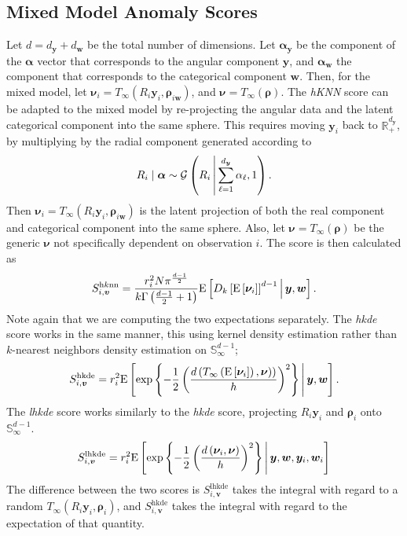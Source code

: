 \subsection{Mixed Model Anomaly Scores\label{sec:mixedscores}}
Let $d = d_{\bm{y}} + d_{\bm{w}}$ be the total number of dimensions.  Let 
    $\bm{\alpha}_{\bm{y}}$ be the component of the $\bm{\alpha}$ vector that 
    corresponds  to the angular component $\bm{y}$, and $\bm{\alpha}_{\bm{w}}$ 
    the component that corresponds to the categorical component $\bm{w}$.
    Then, for the mixed model, let 
    $\bm{\nu}_i = T_{\infty}(R_i\bm{y}_i, \bm{\rho}_{i\bm{w}})$, and 
    $\bm{\nu} = T_{\infty}(\bm{\rho})$.  The \emph{hKNN} score can be adapted 
    to the mixed model by re-projecting the angular data and the latent 
    categorical component into the same sphere. This requires moving $\bm{y}_i$ 
    back to $\mathbb{R}_+^{d_{\bm{y}}}$, by multiplying by the radial component
    generated according to
    \[
        R_i\mid\bm{\alpha} \sim \mathcal{G}
        \left(R_i\,\middle\vert\,\sum_{\ell = 1}^{d_{\bm{y}}}\alpha_{\ell}, 1\right).
    \]
    Then $\bm{\nu}_i = T_{\infty}(R_i\bm{y}_i, \bm{\rho}_{i\bm{w}})$ is the 
    latent projection of both the real component and categorical component into 
    the same sphere.  Also, let $\bm{\nu} = T_{\infty}(\bm{\rho})$ be the 
    generic $\bm{\nu}$ not specifically dependent on observation $i$.  The 
    score is then calculated as
    \[
        S_{i,\bm{v}}^{\text{h$k$nn}} = \frac{r_i^2 N\pi^{\frac{d-1}{2}}}{
                k\Gamma\left(\frac{d-1}{2} + 1\right)}
        \text{E}\left[D_{k}\left[\text{E}\left[\bm{\nu}_i\right]\right]^{d-1}\,\middle\vert\,\bm{y},\bm{w}\right].
    \]
    Note again that we are computing the two expectations separately.  The 
    \emph{hkde} score works in the same manner, this using kernel density 
    estimation rather than $k$-nearest neighbors density estimation on 
    $\mathbb{S}_{\infty}^{d-1}$;
    \[
        S_{i,\bm{v}}^{\text{hkde}} = r_i^2 \text{E}\left[\exp\left\lbrace -\frac{1}{2}
            \left(
            \frac{d\left(T_{\infty}
                \left(\text{E}\left[\bm{\nu}_i\right]\right), \bm{\nu})\right)}{h}
            \right)^2
            \right\rbrace \,\middle\vert\, \bm{y},\bm{w}
            \right].
    \]
    The \emph{lhkde} score works similarly to the \emph{hkde} score, projecting
    $R_i\bm{y}_i$ and $\bm{\rho}_i$ onto $\mathbb{S}_{\infty}^{d-1}$.  
    \[
    S_{i,\bm{v}}^{\text{lhkde}} = r_i^2 \text{E}\left[\exp\left\lbrace-\frac{1}{2}\left(
        \frac{d\left(\bm{\nu}_i, \bm{\nu}\right)}{h}\right)^2\right\rbrace
        \,\middle\vert\, \bm{y},\bm{w},\bm{y}_i,\bm{w}_i\right]
    \]
    The difference between the two scores is $S_{i,\bm{v}}^{\text{lhkde}}$
    takes the integral with regard to a random 
    $T_{\infty}(R_i\bm{y}_i,\bm{\rho}_i)$, and $S_{i,\bm{v}}^{\text{hkde}}$ 
    takes the integral with regard to the expectation of that quantity.

